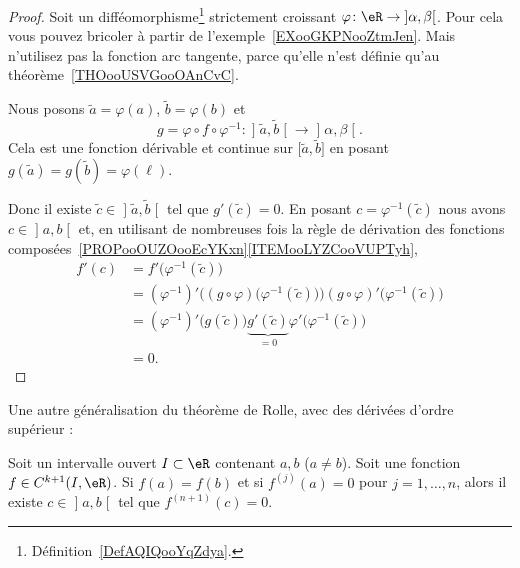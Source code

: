 \begin{proof}
	Soit un difféomorphisme\footnote{Définition~\ref{DefAQIQooYqZdya}.} strictement croissant \( \varphi\colon \eR\to \mathopen] \alpha , \beta \mathclose[\). Pour cela vous pouvez bricoler à partir de l'exemple~\ref{EXooGKPNooZtmJen}.
		Mais n'utilisez pas la fonction arc tangente, parce qu'elle n'est définie qu'au théorème~\ref{THOooUSVGooOAnCvC}.

		Nous posons \( \tilde a=\varphi(a)\), \( \tilde b=\varphi(b)\) et
		\begin{equation}
			g= \varphi\circ f\circ \varphi^{-1}\colon \mathopen] \tilde  a , \tilde b \mathclose[\to \mathopen] \alpha , \beta \mathclose[.
		\end{equation}
		Cela est une fonction dérivable et continue sur \( \mathopen[ \tilde a , \tilde  b \mathclose]\) en posant \( g(\tilde a)=g(\tilde b)=\varphi(\ell)\).

		Donc il existe \( \tilde c\in\mathopen] \tilde a , \tilde b \mathclose[\) tel que \( g'(\tilde c)=0\). En posant \( c=\varphi^{-1}(\tilde c)\) nous avons \( c\in \mathopen] a , b \mathclose[\) et, en utilisant de nombreuses fois la règle de dérivation des fonctions composées~\ref{PROPooOUZOooEcYKxn}\ref{ITEMooLYZCooVUPTyh},
	\begin{subequations}
		\begin{align}
			f'(c) & =f'\big( \varphi^{-1}(\tilde c) \big)                                                                                      \\
			      & =(\varphi^{-1})'\Big( (g\circ \varphi)\big( \varphi^{-1}(\tilde c) \big) \Big)(g\circ\varphi)'\big( \varphi^{-1}(\tilde c) \big) \\
			      & =(\varphi^{-1})'\big( g(\tilde c) \big)\underbrace{g'(\tilde c)}_{=0}\varphi'\big( \varphi^{-1}(\tilde c) \big)                        \\
			      & =0.
		\end{align}
	\end{subequations}
\end{proof}

Une autre généralisation du théorème de Rolle, avec des dérivées d'ordre supérieur :
\begin{proposition}      \label{PROPooCPCAooJjOZNy}
	Soit un intervalle ouvert \( I\subset \eR\) contenant \( a,b\) (\( a\neq b\)). Soit une fonction \( f\in C^{k+1}(I,\eR)\). Si \( f(a)=f(b)\) et si \( f^{(j)}(a)=0\) pour \( j=1,\ldots, n\), alors il existe \( c\in \mathopen] a , b \mathclose[\) tel que \( f^{(n+1)}(c)=0\).
\end{proposition}

